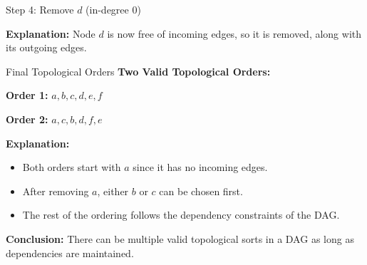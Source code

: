 \begin{frame}{Step 4: Remove $d$ (in-degree 0)}
\centering
{}

\vspace{0.5cm}
\textbf{Explanation:} Node $d$ is now free of incoming edges, so it is removed, along with its outgoing edges.
\end{frame}

\begin{frame}{Final Topological Orders}
\centering
\textbf{Two Valid Topological Orders:}

\vspace{0.5cm}

\textbf{Order 1:} $a, b, c, d, e, f$

\textbf{Order 2:} $a, c, b, d, f, e$

\vspace{0.5cm}

\textbf{Explanation:}
\begin{itemize}
    \item Both orders start with $a$ since it has no incoming edges.
    \item After removing $a$, either $b$ or $c$ can be chosen first.
    \item The rest of the ordering follows the dependency constraints of the DAG.
\end{itemize}

\vspace{0.5cm}
\textbf{Conclusion:} There can be multiple valid topological sorts in a DAG as long as dependencies are maintained.
\end{frame}




